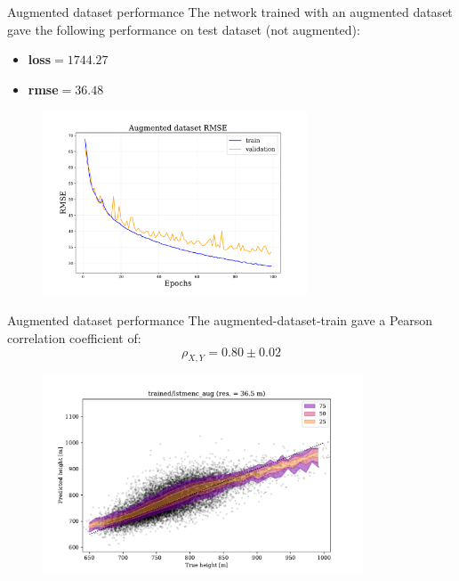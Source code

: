 \documentclass{beamer}
\begin{document}
\begin{frame}{Augmented dataset performance}
    The network trained with an augmented dataset gave the following performance on test dataset (not augmented):
    \begin{itemize}
        \item[\textbullet] \textbf{loss}$=1744.27$
        \item[\textbullet] \textbf{rmse}$=36.48$
    \end{itemize}

        \begin{figure}
            \centering
            \includegraphics[width=0.7\textwidth]{figures/lstmenc_aug_rmse.pdf}
        \end{figure}

\end{frame}

\begin{frame}{Augmented dataset performance}
    The augmented-dataset-train gave a Pearson correlation coefficient of:
    \begin{equation*}
        \rho_{X,Y} = 0.80 \pm 0.02
    \end{equation*}

        \begin{figure}
            \centering
            \includegraphics[width=0.85\textwidth]{figures/augmented_train_stats.pdf}
        \end{figure}

\end{frame}
\end{document}
